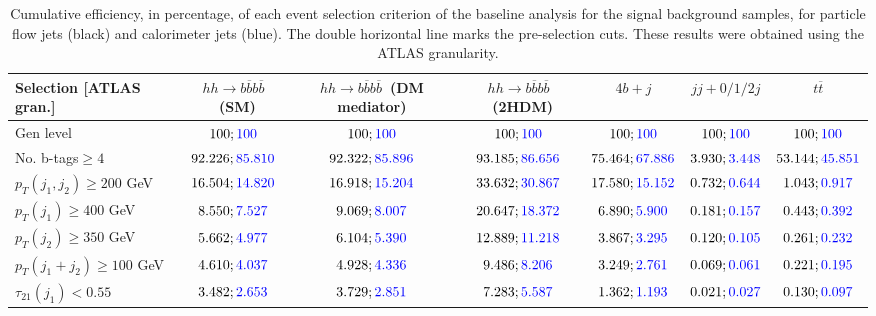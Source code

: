 \begin{landscape}
	\begin{table}
		\centering
		\caption{Cumulative efficiency, in percentage, of each event selection criterion of the baseline analysis for the signal background samples, for particle flow jets (black) and calorimeter jets (blue). The double horizontal line marks the pre-selection cuts. These results were obtained using the ATLAS granularity.}
		\begin{tabular}{lcccccc}
			\toprule 
			\textbf{Selection [ATLAS gran.]} & $hh\rightarrow b\overline{b}b\overline{b}$~(SM) & $hh\rightarrow b\overline{b}b\overline{b}$~(DM mediator) & $hh\rightarrow b\overline{b}b\overline{b}$~(2HDM) & $4b+j$  & $jj+0/1/2 j$ & $t\overline{t}$ \\
			\midrule
			Gen level & $100;\textcolor{blue}{100}$ & $100;\textcolor{blue}{100}$ &$100;\textcolor{blue}{100}$& $100;\textcolor{blue}{100}$& $100;\textcolor{blue}{100}$& $100;\textcolor{blue}{100}$ \\
			\rowcolor{black!7}No. b-tags$\geq 4$&$92.226;\textcolor{blue}{85.810}$&$92.322;\textcolor{blue}{85.896}$&$93.185;\textcolor{blue}{86.656}$&$75.464;\textcolor{blue}{67.886}$&$3.930;\textcolor{blue}{3.448}$&$53.144;\textcolor{blue}{45.851}$\\
			$p_T(j_1,j_2)\geq200$ GeV & $16.504;\textcolor{blue}{14.820}$ & $16.918;\textcolor{blue}{15.204}$&$33.632;\textcolor{blue}{30.867}$ &$17.580;\textcolor{blue}{15.152}$&$0.732;\textcolor{blue}{0.644}$&$1.043;\textcolor{blue}{0.917}$\\
			\midrule \midrule
			\rowcolor{black!7}$p_T(j_1)\geq 400$ GeV & $8.550;\textcolor{blue}{7.527}$ &$9.069;\textcolor{blue}{8.007}$  &$20.647;\textcolor{blue}{18.372}$&$6.890;\textcolor{blue}{5.900}$&$0.181;\textcolor{blue}{0.157}$&$0.443;\textcolor{blue}{0.392}$\\ 
			$p_T(j_2)\geq 350$ GeV & $5.662;\textcolor{blue}{4.977}$& $6.104;\textcolor{blue}{5.390}$&$12.889;\textcolor{blue}{11.218}$&$3.867;\textcolor{blue}{3.295}$&$0.120;\textcolor{blue}{0.105}$&$0.261;\textcolor{blue}{0.232}$\\
			\rowcolor{black!7}$p_T(j_1+j_2)\geq 100$ GeV &$4.610;\textcolor{blue}{4.037}$ & $4.928;\textcolor{blue}{4.336}$ &$9.486;\textcolor{blue}{8.206}$&$3.249;\textcolor{blue}{2.761}$&$0.069;\textcolor{blue}{0.061}$&$0.221;\textcolor{blue}{0.195}$\\
			$\tau_{21}(j_1)<0.55$ & $3.482;\textcolor{blue}{2.653}$& $3.729;\textcolor{blue}{2.851}$&$7.283;\textcolor{blue}{5.587}$&$1.362;\textcolor{blue}{1.193}$&$0.021;\textcolor{blue}{0.027}$&$0.130;\textcolor{blue}{0.097}$\\

\end{tabular}
\end{table}
\end{landscape}
